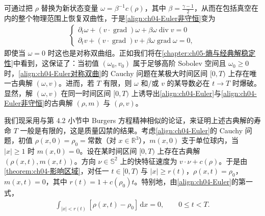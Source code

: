 ﻿\documentclass[../../main.tex]{subfiles}
\begin{document}
可通过把 $\rho$ 替换为新状态变量 $\omega=\beta^{-1}c(\rho)$，其中 $\beta=\tfrac{\gamma-1}{2}$，从而在包括真空在内的整个物理范围上恢复双曲性，于是\eqref{align:ch04-Euler非守恒}变为
\begin{align}
\begin{cases}
\partial_{t}\omega+(v\cdot\operatorname{grad})\omega+\beta\omega\operatorname{div}v=0\\
\partial_{t}v+(v\cdot\operatorname{grad})v+\beta\omega\operatorname{grad}\omega=0,
\end{cases}
\label{align:ch04-Euler对称双曲}
\end{align}
即使当 $\omega=0$ 时这也是对称双曲组。正如我们将在\cref{chapter:ch05-熵与经典解稳定性}中看到，这保证了：当初值 $(\omega_{0},v_{0})$ 属于足够高阶 Sobolev 空间且 $\omega_{0}\geqslant 0$ 时，\eqref{align:ch04-Euler对称双曲}的 Cauchy 问题在某极大时间区间 $[0,T)$ 上存在唯一古典解 $(\omega,v)$。进而，若 $T$ 有限，则 $\omega$ 和/或 $v$ 的某导数必在 $t\to T$ 时爆破。显然，解 $(\omega,v)$ 在同一时间区间 $[0,T)$ 上诱导出\eqref{align:ch04-Euler}与\eqref{align:ch04-Euler非守恒}的古典解 $(\rho,m)$ 与 $(\rho,v)$。


我们现采用与第 4.2 小节中 Burgers 方程精神相似的论证，来证明上述古典解的寿命 $T$ 一般是有限的，这是质量囚禁的结果。考虑\eqref{align:ch04-Euler}的 Cauchy 问题，初值 $\rho(x,0)=\rho_{0}=\text{常数}$（对 $x\in\mathbb{R}^{3}$），$m(x,0)$ 支于单位球内，当 $|x|\geqslant 1$ 时 $m(x,0)=0$。设在某时间区间 $[0,T)$ 上存在古典解 $(\rho(x,t),m(x,t))$。方向 $\nu\in\mathbb{S}^{2}$ 上的快特征速度为 $v\cdot\nu+c(\rho)$。于是由\cref{theorem:ch04-影响区域}，对任一 $t\in[0,T)$ 与 $|x|\geqslant r(t)$，$\rho(x,t)=\rho_{0}$，$m(x,t)=0$，其中 $r(t)=1+c(\rho_{0})t$。特别地，由\eqref{align:ch04-Euler}的第一式，
\begin{align}
\int_{|x|<r(t)}[\rho(x,t)-\rho_{0}]\,\mathrm{d}x=0,\qquad 0\leqslant t<T.
\label{align:ch04-质量守恒}
\end{align}
\end{document}
